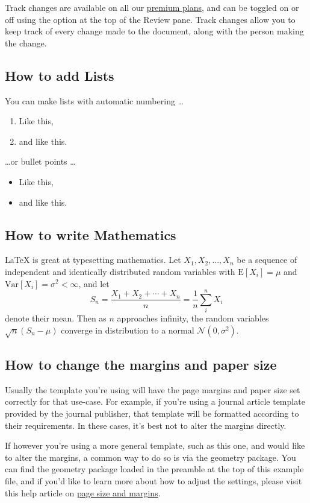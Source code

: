 \documentclass[twocolumn, 9pt]{extarticle}
\begin{document}
Track changes are available on all our \href{https://www.overleaf.com/user/subscription/plans}{premium plans}, and can be toggled on or off using the option at the top of the Review pane. Track changes allow you to keep track of every change made to the document, along with the person making the change. 

\subsection{How to add Lists}

You can make lists with automatic numbering \dots

\begin{enumerate}
\item Like this,
\item and like this.
\end{enumerate}
\dots or bullet points \dots
\begin{itemize}
\item Like this,
\item and like this.
\end{itemize}

\subsection{How to write Mathematics}

\LaTeX{} is great at typesetting mathematics. Let $X_1, X_2, \ldots, X_n$ be a sequence of independent and identically distributed random variables with $\text{E}[X_i] = \mu$ and $\text{Var}[X_i] = \sigma^2 < \infty$, and let
\[S_n = \frac{X_1 + X_2 + \cdots + X_n}{n}
      = \frac{1}{n}\sum_{i}^{n} X_i\]
denote their mean. Then as $n$ approaches infinity, the random variables $\sqrt{n}(S_n - \mu)$ converge in distribution to a normal $\mathcal{N}(0, \sigma^2)$.


\subsection{How to change the margins and paper size}

Usually the template you're using will have the page margins and paper size set correctly for that use-case. For example, if you're using a journal article template provided by the journal publisher, that template will be formatted according to their requirements. In these cases, it's best not to alter the margins directly.

If however you're using a more general template, such as this one, and would like to alter the margins, a common way to do so is via the geometry package. You can find the geometry package loaded in the preamble at the top of this example file, and if you'd like to learn more about how to adjust the settings, please visit this help article on \href{https://www.overleaf.com/learn/latex/page_size_and_margins}{page size and margins}.
\end{document}
